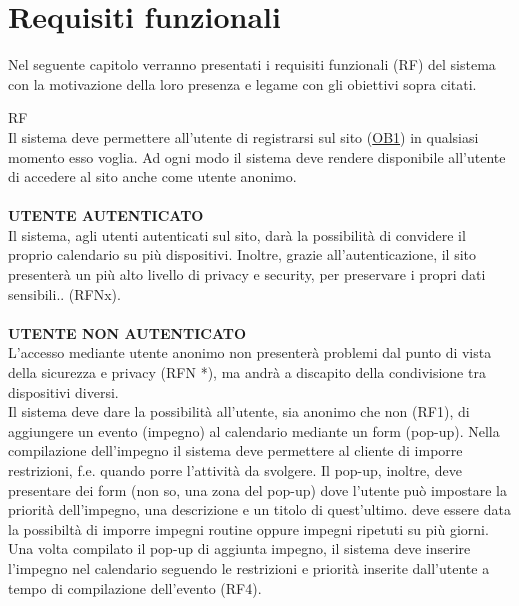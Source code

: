 \section{Requisiti funzionali}
\label{sec:RequisitiFunzionali}

Nel seguente capitolo verranno presentati i requisiti funzionali (RF)
del sistema con la motivazione della loro presenza e legame 
con gli obiettivi sopra citati. 
\begin {mylist} {RF}
      \\ %
    Il sistema deve permettere all'utente di registrarsi sul sito (\hyperlink{ob.one}{OB1}) in qualsiasi momento 
    esso voglia. Ad ogni modo il sistema deve rendere disponibile all'utente di accedere al sito
    anche come utente anonimo. \\ \\
    \textbf{UTENTE AUTENTICATO}
     \\ 
    Il sistema, agli utenti autenticati sul sito, darà la possibilità di convidere 
    il proprio calendario su più dispositivi. Inoltre, grazie all'autenticazione, il sito
    presenterà un più alto livello di privacy e security, per preservare i propri dati sensibili..
    (RFNx). \\ \\
    \textbf{UTENTE NON AUTENTICATO}
     \\
    L'accesso mediante utente anonimo non presenterà problemi dal punto di vista 
    della sicurezza e privacy (RFN *), ma andrà a discapito della condivisione
    tra dispositivi diversi.
     \\
    Il sistema deve dare la possibilità all'utente, sia anonimo che non (RF1), di aggiungere
    un evento (impegno) al calendario mediante un form (pop-up). Nella compilazione
    dell'impegno il sistema deve permettere al cliente di imporre restrizioni, f.e. quando porre
    l'attività da svolgere. Il pop-up, inoltre, deve presentare dei form (non so, una 
    zona del pop-up) dove l'utente può impostare la priorità dell'impegno, una descrizione e un
    titolo di quest'ultimo.
    deve essere data la possibiltà di imporre impegni routine oppure impegni ripetuti su 
    più giorni. 
     \\
    Una volta compilato il pop-up di aggiunta impegno, il sistema 
    deve inserire l'impegno nel calendario seguendo le restrizioni e priorità inserite 
    dall'utente a tempo di compilazione dell'evento (RF4).  

\end{mylist}
